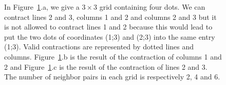\begin{figure}[!ht]
\begin{tikzpicture}
	\end{tikzpicture}
	\caption{In Figure~\ref{fig:introduction:example}.a, we give a $3 \times 3$ grid containing four dots. We can contract lines 2 and 3, columns 1 and 2 and columns 2 and 3 but it is not allowed to contract lines 1 and 2 because this would lead to put the two dots of coordinates (1;3) and (2;3) into the same entry (1;3). Valid contractions are represented by dotted lines and columns. Figure~\ref{fig:introduction:example}.b is the result of the contraction of columns 1 and 2 and Figure~\ref{fig:introduction:example}.c is the result of the contraction of lines 2 and 3. The number of neighbor pairs in each grid is respectively 2, 4 and 6.}
	\label{fig:introduction:example}
\end{figure}
\vspace{-0.3cm}